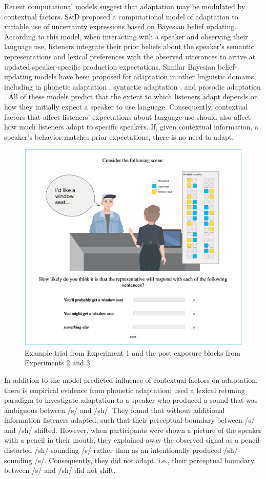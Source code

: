 Recent computational models suggest that adaptation may be modulated by contextual factors. S\&D  proposed a computational model of adaptation to variable use of uncertainty expressions based on Bayesian belief updating. According to this model, when interacting with a speaker and observing their language use, listeners integrate their prior beliefs about the speaker's semantic representations and lexical preferences with the observed utterances to arrive at updated speaker-specific production expectations. Similar Bayesian belief-updating models have been proposed for adaptation in other linguistic domains, including in phonetic adaptation \cite{Kleinschmidt2015}, syntactic adaptation \cite{Kleinschmidt2012}, and prosodic adaptation \cite{Roettger2019}. All of these models predict that the extent to which listeners adapt depends on how they initially expect a speaker to use language. Consequently, contextual factors that affect listeners' expectations about language use should also affect how much listeners adapt to specific speakers. If, given contextual information, a speaker's behavior matches prior expectations, there is no need to adapt.

\begin{figure}
    \centering
    \includegraphics[width=0.9\columnwidth, trim={0 1cm 0 0cm}]{./plots/example-trial.png}
    \caption{Example trial from Experiment 1 and the post-exposure blocks from Experiments 2 and 3.}
    \label{fig:example-trial}
\end{figure}

In addition to the model-predicted influence of contextual factors on adaptation, there is  empirical evidence from phonetic adaptation: \cite{Kraljic2008} used a lexical retuning paradigm to investigate adaptation to a speaker who produced a sound that was ambiguous between /s/ and /sh/. They found that without additional information listeners adapted, such that their perceptual boundary between /s/ and /sh/ shifted. However, when participants were shown a picture of the speaker with a pencil in their mouth, they explained away the observed signal as a pencil-distorted /sh/-sounding /s/ rather than as an intentionally produced /sh/-sounding /s/. Consequently, they did not adapt, i.e., their perceptual boundary between /s/ and /sh/ did not shift.

